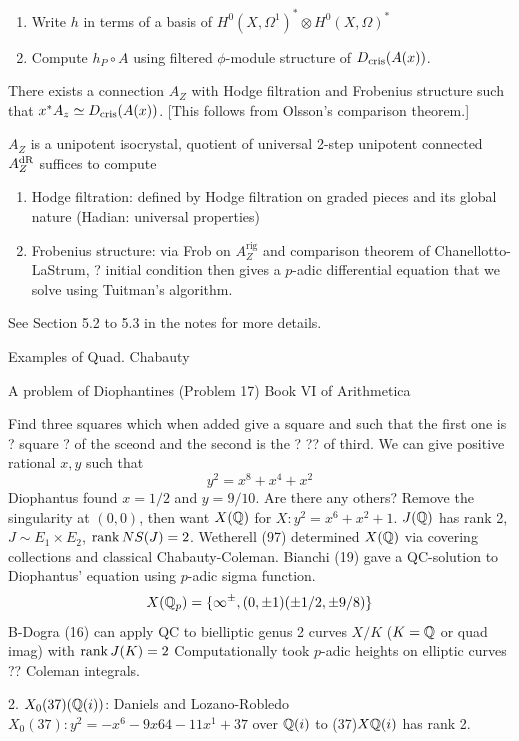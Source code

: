 \begin{enumerate}[1.]
\item Write $h$ in terms of a basis of $H^0(X,\Omega^1)^* \otimes H^0(X,\Omega)^*$
\item Compute $h_P \circ A$ using filtered $\phi$-module structure of $D_{\text{cris}}(A(x))$.
\end{enumerate}


\begin{lem}
There exists a connection $A_Z$ with Hodge filtration and Frobenius structure such that $x^*A_z \simeq D_{\text{cris}}(A(x))$. [This follows from Olsson's comparison theorem.]
\end{lem}


$A_Z$ is a unipotent isocrystal, quotient of universal 2-step unipotent connected $A_Z^{\text{dR}}$ suffices to compute


\begin{enumerate}[1.]
\item Hodge filtration: defined by Hodge filtration on graded pieces and its global nature (Hadian: universal properties)
\item Frobenius structure: via Frob on $A_Z^\text{rig}$ and comparison theorem of Chanellotto-LaStrum, ? initial condition then gives a $p$-adic differential equation that we solve using Tuitman's algorithm.
\end{enumerate}


See Section 5.2 to 5.3 in the notes for more details. 


Examples of Quad. Chabauty

A problem of Diophantines (Problem 17) Book VI of Arithmetica 

Find three squares which when added give a square and such that the first one is ? square ? of the sceond and the second is the ? ?? of third. We can give positive rational $x,y$ such that
	\[
	y^2= x^8 + x^4 + x^2
	\]
Diophantus found $x= 1/2$ and $y=9/10$. Are there any others? Remove the singularity at $(0,0)$, then want $X(\mathbb{Q})$ for $X: y^2= x^6+x^2+1$. $J(\mathbb{Q})$ has rank 2, $J \sim E_1 \times E_2$, $\operatorname{rank} NS(J)=2$. Wetherell (97) determined $X(\mathbb{Q})$ via covering collections and classical Chabauty-Coleman. Bianchi (19) gave a QC-solution to Diophantus' equation using $p$-adic sigma function. 
	\[
	X(\mathbb{Q}_p)= \{\infty^\pm,(0,\pm1)(\pm1/2,\pm9/8)\}
	\]
B-Dogra (16) can apply QC to bielliptic genus 2 curves $X/K$ ($K=\mathbb{Q}$ or quad imag) with $\operatorname{rank} J(K)=2$ Computationally took $p$-adic heights on elliptic curves ?? Coleman integrals.


2. $X_0(37)(\mathbb{Q}(i))$: Daniels and Lozano-Robledo $X_0(37): y^2= -x^6 - 9x64 - 11x^1 + 37$ over $\mathbb{Q}(i)$ to (37)$X\mathbb{Q}(i)$ has rank 2.

